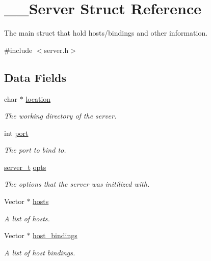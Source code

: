 \hypertarget{struct_____server}{}\section{\+\_\+\+\_\+\+Server Struct Reference}
\label{struct_____server}


The main struct that hold hosts/bindings and other information.  




{\ttfamily \#include $<$server.\+h$>$}

\subsection*{Data Fields}
\begin{DoxyCompactItemize}
\item 
char $\ast$ \mbox{\hyperlink{struct_____server_a34c1fd64941cff2faede91f79ebee8ec}{location}}
\begin{DoxyCompactList}\small\item\em The working directory of the server. \end{DoxyCompactList}\item 
int \mbox{\hyperlink{struct_____server_a4b1f796c585e0682d0284c210fd98ce3}{port}}
\begin{DoxyCompactList}\small\item\em The port to bind to. \end{DoxyCompactList}\item 
\mbox{\hyperlink{server_8h_ac716a2b0d74f0b48cf81937cb7b3f725}{server\+\_\+t}} \mbox{\hyperlink{struct_____server_a7bedad78c4a7e7dc2045067cb99dc237}{opts}}
\begin{DoxyCompactList}\small\item\em The options that the server was initilized with. \end{DoxyCompactList}\item 
Vector $\ast$ \mbox{\hyperlink{struct_____server_aa3be8ce9854d670e8d998ed3447d95ee}{hosts}}
\begin{DoxyCompactList}\small\item\em A list of hosts. \end{DoxyCompactList}\item 
Vector $\ast$ \mbox{\hyperlink{struct_____server_a389d7a5fe24d9711632aabfed1c37ae3}{host\+\_\+bindings}}
\begin{DoxyCompactList}\small\item\em A list of host bindings. \end{DoxyCompactList}\end{DoxyCompactItemize}


